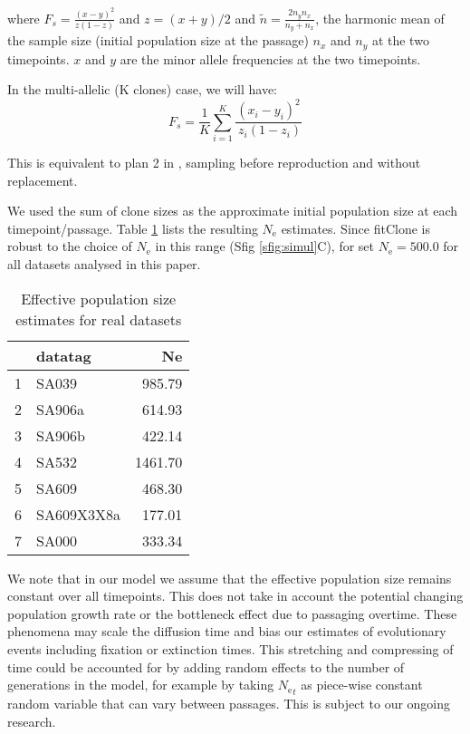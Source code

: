 \documentclass{article}
\newcommand{\eps}{N_{\text{e}}}
\begin{document}
where 
$ F_s = \frac{(x-y)^2}{z(1-z)} $  and $z = (x+y)/2$ and $\tilde{n} = \frac{2n_{y}n_{x}}{n_y + n_x}$, the harmonic mean of the sample size (initial population size at the passage) $n_x$
and $n_y$ at the two timepoints. 
$x$ and $y$ are the minor allele frequencies at the two timepoints.

In the multi-allelic (K clones) case, we will have:
\[
F_s = \frac{1}{K} \sum_{i=1}^K \frac{ (x_i -y_i)^2}{\ z_i (1-z_i)}
\]

This is equivalent to plan 2 in \cite{jorde1999estimating}, sampling before reproduction and without replacement. 

We used the sum of clone sizes as the approximate initial population size at each timepoint/passage. 
Table \ref{stab:ne_estimate} lists the resulting $\eps$ estimates.
Since fitClone is robust to the choice of $\eps$ in this range (Sfig \ref{sfig:simul}C), for set $\eps = 500.0$ for all datasets analysed in this paper. 

\begin{table}[ht]
\centering
\caption{Effective population size estimates for real datasets}
\label{stab:ne_estimate}
\begin{tabular}{rlr}
  \hline
 & datatag & Ne \\ 
  \hline
1 & SA039 & 985.79 \\ 
  2 & SA906a & 614.93 \\ 
  3 & SA906b & 422.14 \\ 
  4 & SA532 & 1461.70 \\ 
  5 & SA609 & 468.30 \\ 
  6 & SA609X3X8a & 177.01 \\ 
  7 & SA000 & 333.34 \\ 
   \hline
\end{tabular}
\end{table}


We note that in our model we assume that the effective population size remains constant over all timepoints. 
This does not take in account the potential changing population growth rate or the bottleneck effect due to passaging overtime. 
These phenomena may scale the diffusion time and bias our estimates of evolutionary events including fixation or extinction times. 
This stretching and compressing of time could be accounted for by adding random effects to the number of generations in the model, for example by taking ${\eps}_t$ as piece-wise constant random variable that can vary between passages.
This is subject to our ongoing research.
\end{document}
